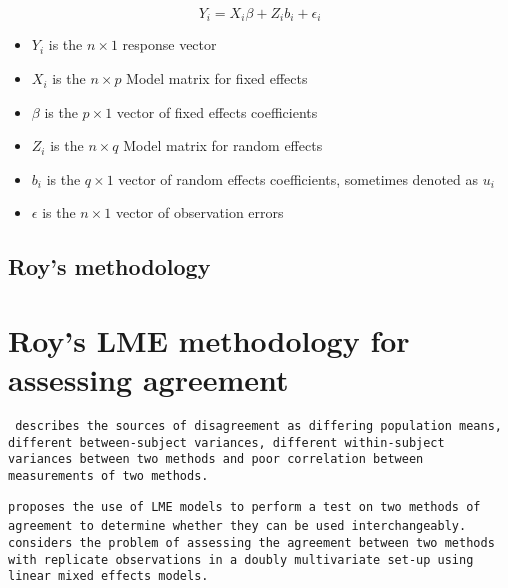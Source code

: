 \documentclass[12pt, a4paper]{report}
\theoremstyle{plain}
\theoremstyle{definition}
\theoremstyle{remark}
\begin{document}
\begin{displaymath}
Y_{i} =X_{i}\beta + Z_{i}b_{i} + \epsilon_{i}
\end{displaymath}
\begin{itemize}
	
	\item $Y_{i}$ is the $n \times 1$ response vector \item $X_{i}$ is
	the $n \times p$ Model matrix for fixed effects \item $\beta$ is
	the $p \times 1$ vector of fixed effects coefficients \item
	$Z_{i}$ is the $n \times q$ Model matrix for random effects \item
	$b_{i}$ is the $q \times 1$ vector of random effects coefficients,
	sometimes denoted as $u_{i}$ \item $\epsilon$ is the $n \times 1$
	vector of observation errors
\end{itemize}



\newpage
\subsection{Roy's methodology}






\section{Roy's LME methodology for assessing agreement}
\texttt{\citet{Barnhart}  describes the sources of disagreement as
	differing population means, different between-subject variances,
	different within-subject variances between two methods and poor
	correlation between measurements of two methods.	}

\texttt{\citet{ARoy2009}proposes the use of LME models to perform a test
	on two methods of agreement to determine whether they can be used
	interchangeably.	}
\texttt{ \citet{ARoy2009} considers the problem of assessing the agreement
	between two methods with replicate observations in a doubly
	multivariate set-up using linear mixed effects models.}
\end{document}
